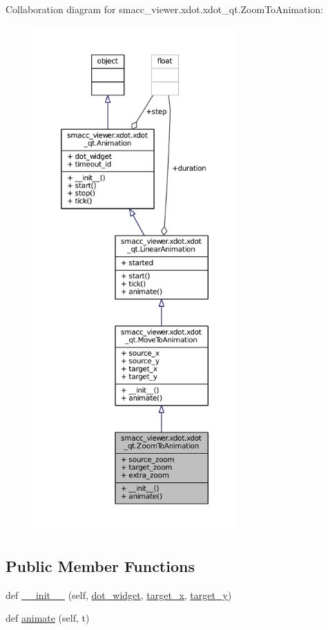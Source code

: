 Collaboration diagram for smacc\+\_\+viewer.\+xdot.\+xdot\+\_\+qt.\+Zoom\+To\+Animation\+:
\nopagebreak
\begin{figure}[H]
\begin{center}
\leavevmode
\includegraphics[height=550pt]{classsmacc__viewer_1_1xdot_1_1xdot__qt_1_1ZoomToAnimation__coll__graph}
\end{center}
\end{figure}
\subsection*{Public Member Functions}
\begin{DoxyCompactItemize}
\item 
def \hyperlink{classsmacc__viewer_1_1xdot_1_1xdot__qt_1_1ZoomToAnimation_a29cad6d4a0c70d2abe0f7b8d5db36249}{\+\_\+\+\_\+init\+\_\+\+\_\+} (self, \hyperlink{classsmacc__viewer_1_1xdot_1_1xdot__qt_1_1Animation_a8343fc754289769e4199933a2ef8b6c2}{dot\+\_\+widget}, \hyperlink{classsmacc__viewer_1_1xdot_1_1xdot__qt_1_1MoveToAnimation_a7a7a24555d78e358db021b1685d35916}{target\+\_\+x}, \hyperlink{classsmacc__viewer_1_1xdot_1_1xdot__qt_1_1MoveToAnimation_adf69b91918027d26503debdd035b822c}{target\+\_\+y})
\item 
def \hyperlink{classsmacc__viewer_1_1xdot_1_1xdot__qt_1_1ZoomToAnimation_aca8e252a1905616f19fdeda9e9bfac85}{animate} (self, t)
\end{DoxyCompactItemize}
